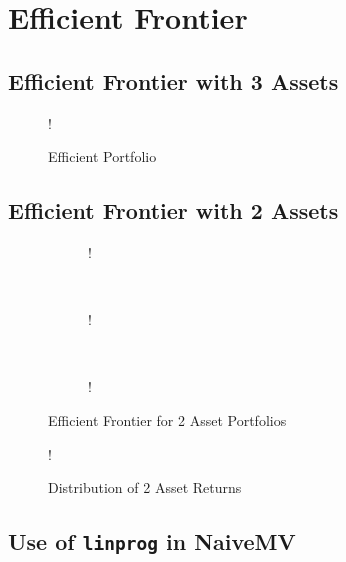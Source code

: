 \documentclass[11pt]{article}
\begin{document}
\section{Efficient Frontier}

\subsection{Efficient Frontier with 3 Assets}

\begin{wrapfigure}{!h}{0.45\textwidth}
  \begin{center}
    \resizebox {0.45\textwidth} {!} { }
	\caption{Efficient Portfolio}
	\label{fig:q1-a-efficient-portfolio}
  \end{center}
\end{wrapfigure}

\subsection{Efficient Frontier with 2 Assets}

\begin{figure}[!h]
   \centering 
   \begin{subfigure}[b]{0.30\textwidth}
     	\resizebox {\textwidth} {!} { }
		\label{fig:q1-b-efficient-frontier-1}
    \end{subfigure}
    ~
    \begin{subfigure}[b]{0.30\textwidth}
       	\resizebox {\textwidth} {!} { }
        \label{fig:q1-b-efficient-frontier-2}
    \end{subfigure}
	~
    \begin{subfigure}[b]{0.30\textwidth}
       	\resizebox {\textwidth} {!} { }
        \label{fig:q1-b-efficient-frontier-3}
    \end{subfigure}
    \caption{Efficient Frontier for 2 Asset Portfolios}\label{fig:naive_v_cvx}
\end{figure}

\begin{figure}[!h]
	\centering 
	\resizebox {\textwidth} {!} { }
	\caption{Distribution of 2 Asset Returns}
	\label{fig:q1-b-return-distribution}
\end{figure}

\subsection{Use of \texttt{linprog} in NaiveMV}
\end{document}
